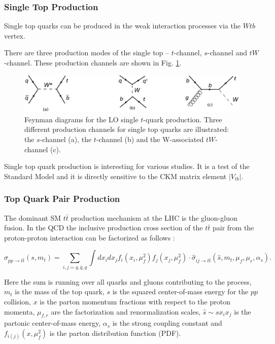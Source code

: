 \subsubsection{Single Top Production}

Single top quarks can be produced in the weak interaction processes via the $Wtb$ vertex.

There are three production modes of the single top -- $t$-channel, $s$-channel and $tW$-channel. These production channels are shown in Fig. \ref{fig:single_t_prod}.

\begin{figure}[H]
  \centering
  \includegraphics[width=1.0\textwidth]{01_Theory_SM/plots/single_top_uniform.png}
  \caption{Feynman diagrams for the LO single $t$-quark production. Three different production channels for single top quarks are illustrated: 
  the $s$-channel (a), the $t$-channel (b) and the W-associated $tW$-channel (c).}
  \label{fig:single_t_prod}
\end{figure}

Single top quark production is interesting for various studies. It is a test of the Standard Model and it is directly sensitive to the CKM matrix
element $|V_{tb}|$.

\subsubsection{Top Quark Pair Production}\label{ssec:tt_prod}

The dominant SM $t\bar{t}$ production mechanism at the LHC is the gluon-gluon fusion. In the QCD the inclusive production cross section of the $t\bar{t}$ pair
from the proton-proton interaction can be factorized as follows \cite{Schilling:2012dx}:

\begin{equation} \label{eq:pptt}
 \sigma_{pp \rightarrow t\bar{t}} (s, m_{t}) = \sum_{i,j = q, \bar{q}, g} \int dx_{i} dx_{j} f_{i}(x_{i}, \mu_{f}^{2}) f_{j}(x_{j}, \mu_{f}^{2}) \cdot \hat{\sigma}_{ij \rightarrow t\bar{t}}(\hat{s}, m_{t}, \mu_{f}, \mu_{r}, \alpha_{s}).
\end{equation}

Here the sum is running over all quarks and gluons contributing to the process, $m_{t}$ is the mass of the top quark, $s$ is the squared center-of-mass 
energy for the $pp$ collision, $x$ is the parton momentum fractions with respect to the proton momenta, $\mu_{f,r}$ are the factorization and renormalization 
scales, $\hat{s} \sim sx_{i}x_{j}$ is the partonic center-of-mass energy, $\alpha_{s}$ is the strong coupling constant and  $f_{i(j)}(x, \mu_{f}^{2})$ is the parton distribution
function (PDF). 

